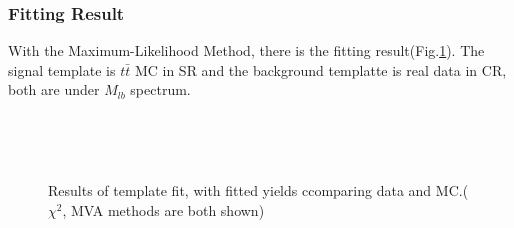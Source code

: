 		\subsubsection{Fitting Result}
		\label{sssec:FittingResult}

		With the Maximum-Likelihood Method, there is the fitting result(Fig.\ref{BkgEst:fig:fit_result_yields}). The signal template is $t\bar{t}$ MC in SR and the background templatte is real data in CR, both are under $M_{lb}$ spectrum.

		\begin{figure}[H]
		\centering
			\\
		\end{figure}
		\FloatBarrier
		\begin{figure}[H]
		\centering
			\\
		\caption{Results of template fit, with fitted yields ccomparing data and MC.($\chi^2$, MVA methods are both shown)}
		\label{BkgEst:fig:fit_result_yields}
		\end{figure}
